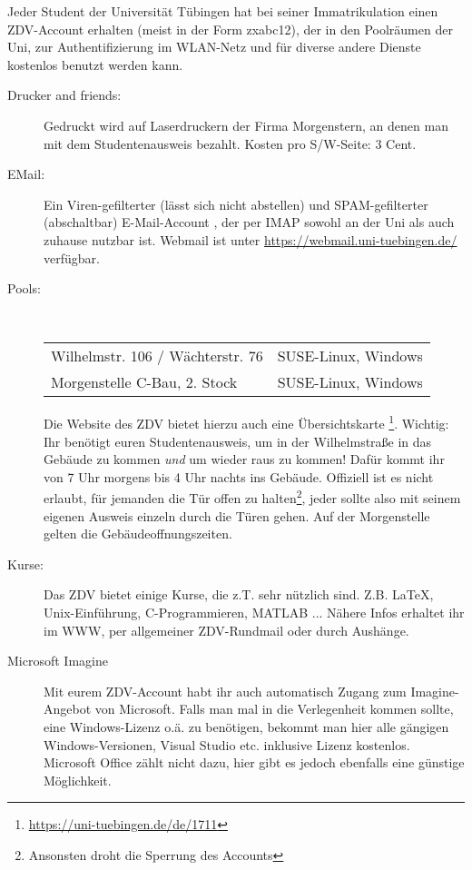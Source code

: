 Jeder Student der Universität Tübingen hat bei seiner Immatrikulation einen ZDV-Account erhalten (meist in der Form zxabc12), der in den Poolräumen der Uni, zur Authentifizierung im WLAN-Netz und für diverse andere Dienste kostenlos benutzt werden kann. 

\begin{description}

  \item[Drucker and friends:]
    Gedruckt wird auf Laserdruckern der Firma Morgenstern, an denen man mit dem Studentenausweis bezahlt. Kosten pro S/W-Seite:
    3 Cent.

  \item[EMail:]
    Ein Viren-gefilterter (lässt sich nicht abstellen) und SPAM-gefilterter
    (abschaltbar) E-Mail-Account ,
    der per IMAP sowohl an der Uni als auch zuhause nutzbar ist. Webmail ist unter \url{https://webmail.uni-tuebingen.de/} verfügbar. 

  \item[Pools:] ~\\
    \begin{tabular}{ll}
      Wilhelmstr. 106 / Wächterstr. 76 &                SUSE-Linux, Windows \\
      Morgenstelle C-Bau, 2. Stock &            SUSE-Linux, Windows \\
    \end{tabular}

    Die Website des ZDV bietet hierzu auch eine Übersichtskarte
    \footnote{\url{https://uni-tuebingen.de/de/1711}}.	%
    Wichtig: Ihr benötigt euren Studentenausweis, um in der Wilhelmstraße in das Gebäude zu kommen \emph{und} um wieder raus zu kommen! Dafür kommt ihr von 7 Uhr morgens bis 4 Uhr nachts ins Gebäude. Offiziell ist es nicht erlaubt, für jemanden die Tür offen zu halten\footnote{Ansonsten droht die Sperrung des Accounts}, jeder sollte also mit seinem eigenen Ausweis einzeln durch die Türen gehen. Auf der Morgenstelle gelten die Gebäudeoffnungszeiten.

  \item[Kurse:]
    Das ZDV bietet einige Kurse, die z.T. sehr nützlich sind. Z.B. \LaTeX,
    Unix-Ein\-führ\-ung, C-Programmieren, MATLAB ... Nähere Infos erhaltet ihr im
    WWW, per allgemeiner ZDV-Rundmail oder durch Aushänge.

   
   \item[Microsoft Imagine] Mit eurem ZDV-Account habt ihr auch automatisch Zugang zum Imagine-Angebot von Microsoft. Falls man mal in die Verlegenheit kommen sollte, eine Windows-Lizenz o.ä. zu benötigen, bekommt man hier alle gängigen Windows-Versionen, Visual Studio etc. inklusive Lizenz kostenlos. Microsoft Office zählt nicht dazu, hier gibt es jedoch ebenfalls eine günstige Möglichkeit.
   

\end{description}
